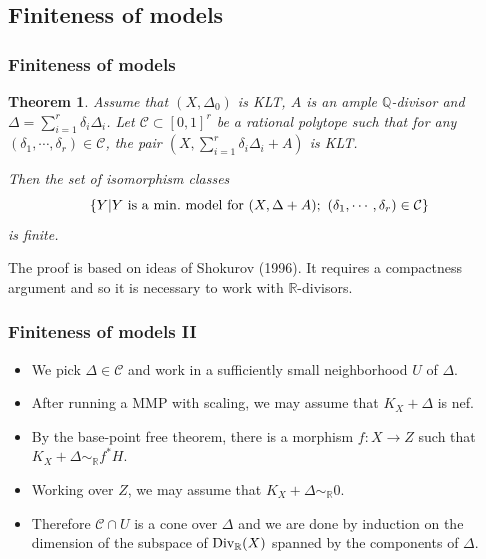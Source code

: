 \documentclass{beamer}
\theoremstyle{plain}
\newtheorem*{thm}{Theorem}
\theoremstyle{definition}
\theoremstyle{remark}
\begin{document}
\subsection{Finiteness of models}
\begin{frame}
\frametitle{Finiteness of models}
\begin{thm} Assume that $(X,\Delta _0)$ is KLT, $A$ is an ample $\mathbb {Q}$-divisor and $\Delta =\sum _{i=1}^r
\delta _i \Delta _i$. Let
$\mathcal{C}\subset [0,1]^r$ be a rational polytope such that
for any $(\delta _1,\cdots ,\delta _r)\in \mathcal{C}$, the pair
$(X,\sum _{i=1}^r
\delta _i \Delta _i+A)$ is KLT. 

Then the set of isomorphism classes $$\{Y|Y\ {\rm is\ a\ min.\ model\
for \ }(X,\Delta +A);\ 
(\delta _1,\cdots ,\delta _r)\in \mathcal{C}\}$$
is finite.\end{thm}
\pause
The proof is based on ideas of Shokurov (1996). It requires a compactness argument
and so it is necessary to work with $\mathbb{R}$-divisors.
\end{frame}
\begin{frame}
\frametitle{Finiteness of models II}
\begin{itemize} 
\item We pick $\Delta \in \mathcal{C}$ and work in a sufficiently small neighborhood $U$ of $\Delta$.
\pause
\item After running a MMP with scaling, we may assume that $K_X+\Delta$ is nef.\pause
\item By the base-point free theorem, there is a morphism 
$f:X\to Z$ such that $K_X+\Delta \sim _{\mathbb R}f^*H$.
\pause
\item Working over $Z$, we may assume that $K_X+\Delta \sim _{\mathbb R} 0$.
\pause
\item Therefore $\mathcal{C}\cap U$ is a cone over $\Delta$ and we are 
done by induction on the dimension of the subspace of ${\rm Div }_{\mathbb {R}}(X)$ spanned by the components of $\Delta$.
\end{itemize}

\end{frame}
\end{document}
